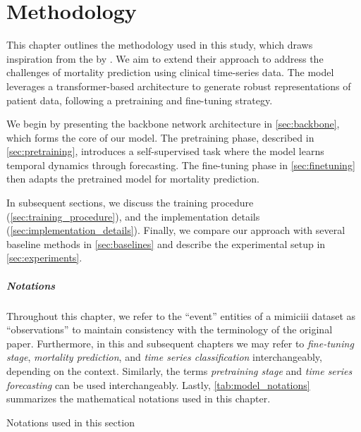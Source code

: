 \chapter{Methodology}
\label{ch:methodology}

This chapter outlines the methodology used in this study, which draws inspiration from the  by \citeauthor{STraTS2022} \cite{STraTS2022}. We aim to extend their approach to address the challenges of mortality prediction using clinical time-series data. The model leverages a transformer-based architecture to generate robust representations of patient data, following a pretraining and fine-tuning strategy.

We begin by presenting the backbone network architecture in \cref{sec:backbone}, which forms the core of our model. The pretraining phase, described in \cref{sec:pretraining}, introduces a self-supervised task where the model learns temporal dynamics through forecasting. The fine-tuning phase in \cref{sec:finetuning} then adapts the pretrained model for mortality prediction.

In subsequent sections, we discuss the training procedure (\cref{sec:training_procedure}), and the implementation details (\cref{sec:implementation_details}). Finally, we compare our approach with several baseline methods in \cref{sec:baselines} and describe the experimental setup in \cref{sec:experiments}.

\paragraph{Notations}

Throughout this chapter, we refer to the ``event'' entities of a \gls{mimiciii} dataset as ``observations'' to maintain consistency with the terminology of the original paper. Furthermore, in this and subsequent chapters we may refer to \textit{fine-tuning stage}, \textit{mortality prediction}, and \textit{time series classification} interchangeably, depending on the context. Similarly, the terms \textit{pretraining stage} and \textit{time series forecasting} can be used interchangeably. Lastly, \cref{tab:model_notations} summarizes the mathematical notations used in this chapter.

\begin{table}[h!]
    \centering
    \caption{Notations used in this section}
    \label{tab:model_notations}
    
\end{table}

